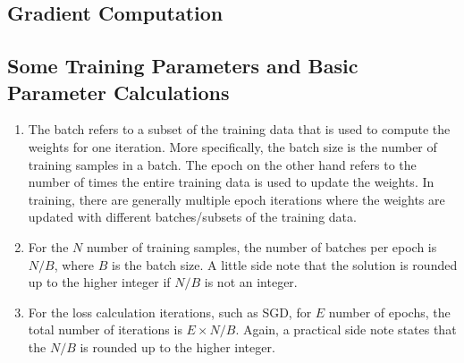 \documentclass[3p,times,procedia]{elsarticle}
\begin{document}

\subsection{\textbf{Gradient Computation}}
\subsection{\textbf{Some Training Parameters and Basic Parameter Calculations}}
\begin{enumerate}
    \item The batch refers to a subset of the training data that is used to compute the weights for one iteration. More specifically, the batch size is the number of training samples in a batch.
 The epoch on the other hand refers to the number of times the entire training data is used to update the weights. In training, there are generally multiple epoch iterations where the weights are updated with different batches/subsets of the training data.
    \item For the $N$ number of training samples, the number of batches per epoch is $N/B$, where $B$ is the batch size. A little side note that the solution is rounded up to the higher integer if $N/B$ is not an integer.
    \item For the loss calculation iterations, such as SGD, for $E$ number of epochs, the total number of iterations is $E \times N/B$. Again, a practical side note states that the $N/B$ is rounded up to the higher integer.
\end{enumerate}
\end{document}
